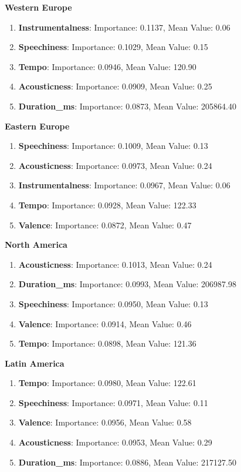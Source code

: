 \textbf{Western Europe}
\begin{enumerate}
    \item \textbf{Instrumentalness}: Importance: 0.1137, Mean Value: 0.06
    \item \textbf{Speechiness}: Importance: 0.1029, Mean Value: 0.15
    \item \textbf{Tempo}: Importance: 0.0946, Mean Value: 120.90
    \item \textbf{Acousticness}: Importance: 0.0909, Mean Value: 0.25
    \item \textbf{Duration\_ms}: Importance: 0.0873, Mean Value: 205864.40
\end{enumerate}

\textbf{Eastern Europe}
\begin{enumerate}
    \item \textbf{Speechiness}: Importance: 0.1009, Mean Value: 0.13
    \item \textbf{Acousticness}: Importance: 0.0973, Mean Value: 0.24
    \item \textbf{Instrumentalness}: Importance: 0.0967, Mean Value: 0.06
    \item \textbf{Tempo}: Importance: 0.0928, Mean Value: 122.33
    \item \textbf{Valence}: Importance: 0.0872, Mean Value: 0.47
\end{enumerate}

\textbf{North America}
\begin{enumerate}
    \item \textbf{Acousticness}: Importance: 0.1013, Mean Value: 0.24
    \item \textbf{Duration\_ms}: Importance: 0.0993, Mean Value: 206987.98
    \item \textbf{Speechiness}: Importance: 0.0950, Mean Value: 0.13
    \item \textbf{Valence}: Importance: 0.0914, Mean Value: 0.46
    \item \textbf{Tempo}: Importance: 0.0898, Mean Value: 121.36
\end{enumerate}


\textbf{Latin America}
\begin{enumerate}
    \item \textbf{Tempo}: Importance: 0.0980, Mean Value: 122.61
    \item \textbf{Speechiness}: Importance: 0.0971, Mean Value: 0.11
    \item \textbf{Valence}: Importance: 0.0956, Mean Value: 0.58
    \item \textbf{Acousticness}: Importance: 0.0953, Mean Value: 0.29
    \item \textbf{Duration\_ms}: Importance: 0.0886, Mean Value: 217127.50
    
\end{enumerate}

